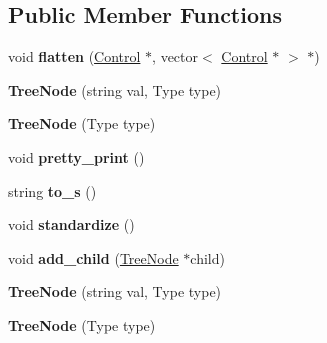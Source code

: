 \subsection*{Public Member Functions}
\begin{DoxyCompactItemize}
\item 
\hypertarget{classTreeNode_a9264936a4297ce3bc1e475cd5d34abb2}{
void {\bfseries flatten} (\hyperlink{classControl}{Control} $\ast$, vector$<$ \hyperlink{classControl}{Control} $\ast$ $>$ $\ast$)}
\label{classTreeNode_a9264936a4297ce3bc1e475cd5d34abb2}

\item 
\hypertarget{classTreeNode_a152c696622ade36c55d67bc91d90ca3c}{
{\bfseries TreeNode} (string val, Type type)}
\label{classTreeNode_a152c696622ade36c55d67bc91d90ca3c}

\item 
\hypertarget{classTreeNode_afa7f9a80b13cd5afe537c35814711c30}{
{\bfseries TreeNode} (Type type)}
\label{classTreeNode_afa7f9a80b13cd5afe537c35814711c30}

\item 
\hypertarget{classTreeNode_a936eef32fb2f710d99b8bffd34bc79d4}{
void {\bfseries pretty\_\-print} ()}
\label{classTreeNode_a936eef32fb2f710d99b8bffd34bc79d4}

\item 
\hypertarget{classTreeNode_a7423ad7dc974bf8eb4eb30135db9af77}{
string {\bfseries to\_\-s} ()}
\label{classTreeNode_a7423ad7dc974bf8eb4eb30135db9af77}

\item 
\hypertarget{classTreeNode_a27260fe76abb7e1020b5bfa1dfdf4009}{
void {\bfseries standardize} ()}
\label{classTreeNode_a27260fe76abb7e1020b5bfa1dfdf4009}

\item 
\hypertarget{classTreeNode_aaea867c260693397308d4b687cf64792}{
void {\bfseries add\_\-child} (\hyperlink{classTreeNode}{TreeNode} $\ast$child)}
\label{classTreeNode_aaea867c260693397308d4b687cf64792}

\item 
\hypertarget{classTreeNode_a152c696622ade36c55d67bc91d90ca3c}{
{\bfseries TreeNode} (string val, Type type)}
\label{classTreeNode_a152c696622ade36c55d67bc91d90ca3c}

\item 
\hypertarget{classTreeNode_afa7f9a80b13cd5afe537c35814711c30}{
{\bfseries TreeNode} (Type type)}
\label{classTreeNode_afa7f9a80b13cd5afe537c35814711c30}


\end{DoxyCompactItemize}
